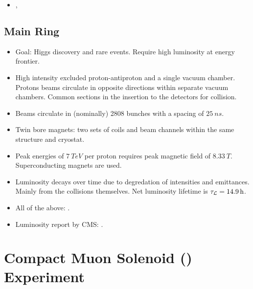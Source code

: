    \begin{itemize}
        \item \cite{Mobs:2197559}, \cite{Benedikt:823808}
    \end{itemize}

    \subsection{\LHC Main Ring}

    \begin{itemize}
        \item Goal: Higgs discovery and rare events. Require high luminosity at
            energy frontier.
        \item High intensity excluded proton-antiproton and a single vacuum chamber.
            Protons beams circulate in opposite directions within separate vacuum
            chambers. Common sections in the insertion to the detectors for
            collision.
        \item Beams circulate in (nominally) 2808 bunches with a spacing of
            ${\SI{25}{ns}}$.
        \item Twin bore magnets: two sets of coils and beam channels within the same
            structure and cryostat.
        \item Peak energies of ${\SI{7}{TeV}}$ per proton requires peak magnetic
            field of ${\SI{8.33}{T}}$. Superconducting magnets are used.
        \item Luminosity decays over time due to degredation of intensities and
            emittances. Mainly from the collisions themselves. Net luminosity
            lifetime is ${\tau_{\mathcal{L}} = \SI{14.9}{h}}$.
        \item All of the above: \cite{Bruning:782076}.
        \item Luminosity report by CMS: \cite{CMS-PAS-LUM-17-001}.
    \end{itemize}

    \section{Compact Muon Solenoid (\CMS) Experiment}

